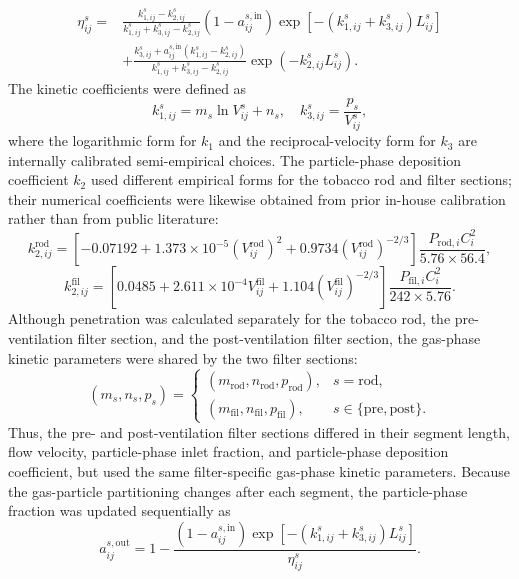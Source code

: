 ﻿\documentclass[a4paper,fleqn]{cas-sc}
\begin{document}
\[
\begin{aligned}
\eta_{ij}^{s}={}&
\frac{k_{1,ij}^{s}-k_{2,ij}^{s}}{k_{1,ij}^{s}+k_{3,ij}^{s}-k_{2,ij}^{s}}
\left(1-a_{ij}^{s,\mathrm{in}}\right)
\exp\left[-\left(k_{1,ij}^{s}+k_{3,ij}^{s}\right)L_{ij}^{s}\right] \\
&+
\frac{k_{3,ij}^{s}+a_{ij}^{s,\mathrm{in}}\left(k_{1,ij}^{s}-k_{2,ij}^{s}\right)}
{k_{1,ij}^{s}+k_{3,ij}^{s}-k_{2,ij}^{s}}
\exp\left(-k_{2,ij}^{s}L_{ij}^{s}\right).
\end{aligned}
\]
The kinetic coefficients were defined as
\[
k_{1,ij}^{s}=m_s\ln V_{ij}^{s}+n_s,
\quad
k_{3,ij}^{s}=\frac{p_s}{V_{ij}^{s}},
\]
where the logarithmic form for $k_1$ and the reciprocal-velocity form for $k_3$ are internally calibrated semi-empirical choices. The particle-phase deposition coefficient $k_2$ used different empirical forms for the tobacco rod and filter sections; their numerical coefficients were likewise obtained from prior in-house calibration rather than from public literature:
\[
k_{2,ij}^{\mathrm{rod}}=
\left[-0.07192+1.373\times10^{-5}\left(V_{ij}^{\mathrm{rod}}\right)^2
+0.9734\left(V_{ij}^{\mathrm{rod}}\right)^{-2/3}\right]
\frac{P_{\mathrm{rod},i}C_i^2}{5.76\times56.4},
\]
\[
k_{2,ij}^{\mathrm{fil}}=
\left[0.0485+2.611\times10^{-4}V_{ij}^{\mathrm{fil}}
+1.104\left(V_{ij}^{\mathrm{fil}}\right)^{-2/3}\right]
\frac{P_{\mathrm{fil},i}C_i^2}{242\times5.76}.
\]
Although penetration was calculated separately for the tobacco rod, the pre-ventilation filter section, and the post-ventilation filter section, the gas-phase kinetic parameters were shared by the two filter sections:
\[
(m_s,n_s,p_s)=
\begin{cases}
(m_{\mathrm{rod}},n_{\mathrm{rod}},p_{\mathrm{rod}}), & s=\mathrm{rod},\\
(m_{\mathrm{fil}},n_{\mathrm{fil}},p_{\mathrm{fil}}), & s\in\{\mathrm{pre},\mathrm{post}\}.
\end{cases}
\]
Thus, the pre- and post-ventilation filter sections differed in their segment length, flow velocity, particle-phase inlet fraction, and particle-phase deposition coefficient, but used the same filter-specific gas-phase kinetic parameters.
Because the gas-particle partitioning changes after each segment, the particle-phase fraction was updated sequentially as
\[
a_{ij}^{s,\mathrm{out}}=
1-\frac{\left(1-a_{ij}^{s,\mathrm{in}}\right)
\exp\left[-\left(k_{1,ij}^{s}+k_{3,ij}^{s}\right)L_{ij}^{s}\right]}
{\eta_{ij}^{s}}.
\]
\end{document}
